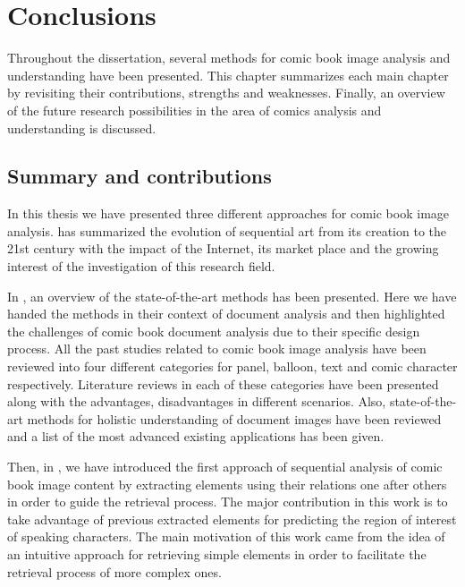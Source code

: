 \chapter{Conclusions} %
\label{chap:conclusions}

Throughout the dissertation, several methods for comic book image analysis and understanding have been presented.
This chapter summarizes each main chapter by revisiting their contributions, strengths and weaknesses.
Finally, an overview of the future research possibilities in the area of comics analysis and understanding is discussed.

\section{Summary and contributions}
\label{conclusions:summary}


In this thesis we have presented three different approaches for comic book image analysis.  has summarized the evolution of sequential art from its creation to the 21st century with the impact of the Internet, its market place and the growing interest of the investigation of this research field.

In , an overview of the state-of-the-art methods has been presented. Here we have handed the methods in their context of document analysis and then highlighted the challenges of comic book document analysis due to their specific design process.
All the past studies related to comic book image analysis have been reviewed into four different categories for panel, balloon, text and comic character respectively.
Literature reviews in each of these categories have been presented along with the advantages, disadvantages in different scenarios.
Also, state-of-the-art methods for holistic understanding of document images have been reviewed and a list of the most advanced existing applications has been given.

Then, in , we have introduced the first approach of sequential analysis of comic book image content by extracting elements using their relations one after others in order to guide the retrieval process.
The major contribution in this work is to take advantage of previous extracted elements for predicting the region of interest of speaking characters.
The main motivation of this work came from the idea of an intuitive approach for retrieving simple elements in order to facilitate the retrieval process of more complex ones.


